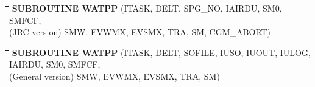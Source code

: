 \documentclass[11pt]{article}
\begin{document}
\bigskip
\bigskip
\bigskip
\bigskip
\bigskip
\bigskip
\bigskip
\nwln
\begin{tabbing}
\hspace{1.27cm}\=\hspace{1.27cm}\=\hspace{1.27cm}\=\hspace{1.27cm}\=%
\hspace{1.27cm}\=\hspace{1.27cm}\=\hspace{1.27cm}\=\hspace{1.27cm}\=%
\hspace{1.27cm}\=\hspace{1.27cm}\=\kill
 {\bf SUBROUTINE WATPP}\> \> \> (ITASK, DELT, SPG\_NO, IAIRDU, SM0, SMFCF,\\
(JRC version)\> \> \>  SMW, EVWMX, EVSMX, TRA, SM, CGM\_ABORT)
\end{tabbing}
\nwln
\begin{tabbing}
\hspace{1.27cm}\=\hspace{1.27cm}\=\hspace{1.27cm}\=\hspace{1.27cm}\=%
\hspace{1.27cm}\=\hspace{1.27cm}\=\hspace{1.27cm}\=\hspace{1.27cm}\=%
\hspace{1.27cm}\=\hspace{1.27cm}\=\kill
{\bf SUBROUTINE WATPP}\> \> \> (ITASK, DELT, SOFILE, IUSO, IUOUT, IULOG, IAIRDU, SM0, SMFCF,\\
(General version)\> \> \>  SMW, EVWMX, EVSMX, TRA, SM)
\end{tabbing}
\nwln
\end{document}
